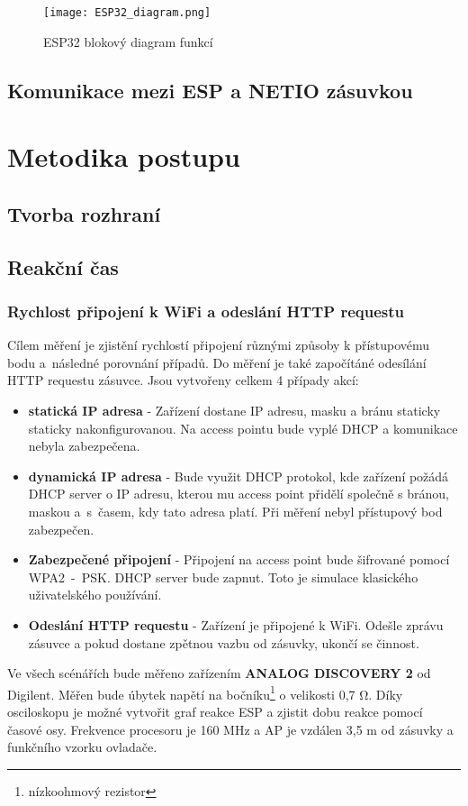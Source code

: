 \documentclass[a4paper, 12pt]{report}
\begin{document}
				\begin{figure}[h]
					\centering
					\texttt{[image: ESP32\_diagram.png]}
					\caption{ESP32 blokový diagram funkcí}
					\label{ESP32_diagram}
				\end{figure}



		\section{Komunikace mezi ESP a NETIO zásuvkou}

	\chapter{Metodika postupu}
		\section{Tvorba rozhraní}
		\section{Reakční čas}
			\subsection{Rychlost připojení k WiFi a odeslání HTTP requestu}
				Cílem měření je zjistění rychlostí připojení různými způsoby k přístupovému bodu a~následné porovnání případů. Do měření je také započítáné odesílání HTTP requestu zásuvce. Jsou vytvořeny celkem 4 případy akcí:
				\begin{itemize}
					\item {\bf statická IP adresa} - 	Zařízení dostane IP adresu, masku a bránu staticky staticky nakonfigurovanou. Na access pointu bude vyplé DHCP a komunikace nebyla zabezpečena.
					\item {\bf dynamická IP adresa} - Bude využit DHCP protokol, kde zařízení požádá DHCP server o IP adresu, kterou mu access point přidělí společně s bránou, maskou a~s~časem, kdy tato adresa platí. Při měření nebyl přístupový bod zabezpečen.
					\item {\bf Zabezpečené připojení} - Připojení na access point bude šifrované pomocí WPA2~-~PSK. DHCP server bude zapnut. Toto je simulace klasického uživatelského používání.
					\item {\bf Odeslání HTTP requestu} - Zařízení je připojené k WiFi. Odešle zprávu zásuvce a pokud dostane zpětnou vazbu od zásuvky, ukončí se činnost.
				\end{itemize}
				Ve všech scénářích bude měřeno zařízením {\bf ANALOG DISCOVERY 2} od Digilent. Měřen bude úbytek napětí na bočníku\footnote{nízkoohmový rezistor} o velikosti 0,7 \si{\ohm}. Díky osciloskopu je možné vytvořit graf reakce ESP a zjistit dobu reakce pomocí časové osy. Frekvence procesoru je 160 \si{MHz} a AP je vzdálen 3,5 \si{m} od zásuvky a funkčního vzorku ovladače.
\end{document}
